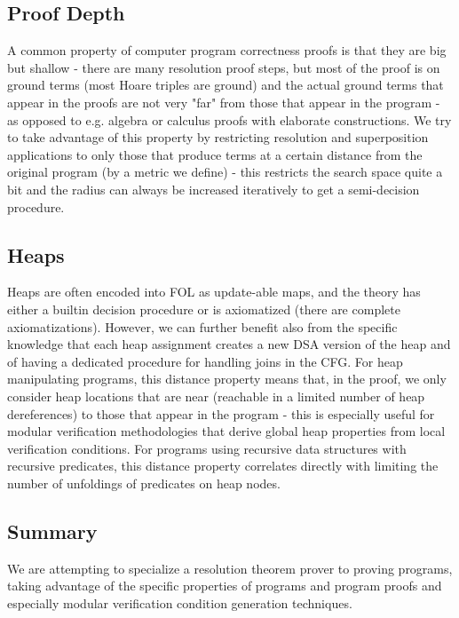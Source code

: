 \subsection{Proof Depth}
A common property of computer program correctness proofs is that they are big but shallow - there are many resolution proof steps, but most of the proof is on ground terms (most Hoare triples are ground) and the actual ground terms that appear in the proofs are not very "far" from those that appear in the program - as opposed to e.g. algebra or calculus proofs with elaborate constructions.
We try to take advantage of this property by restricting resolution and superposition applications to only those that produce terms at a certain distance from the original program (by a metric we define) - this restricts the search space quite a bit and the radius can always be increased iteratively to get a semi-decision procedure.

\subsection{Heaps}
Heaps are often encoded into FOL as update-able maps, and the theory has either a builtin decision procedure or is axiomatized (there are complete axiomatizations). However, we can further benefit also from the specific knowledge that each heap assignment creates a new DSA version of the heap and of having a dedicated procedure for handling joins in the CFG. 
For heap manipulating programs, this distance property means that, in the proof, we only consider heap locations that are near (reachable in a limited number of heap dereferences) to those that appear in the program - this is especially useful for modular verification methodologies that derive global heap properties from local verification conditions.
For programs using recursive data structures with recursive predicates, this distance property correlates directly with limiting the number of unfoldings of predicates on heap nodes.

\subsection{Summary}
We are attempting to specialize a resolution theorem prover to proving programs, taking advantage of the specific properties of programs and program proofs and especially modular verification condition generation techniques.